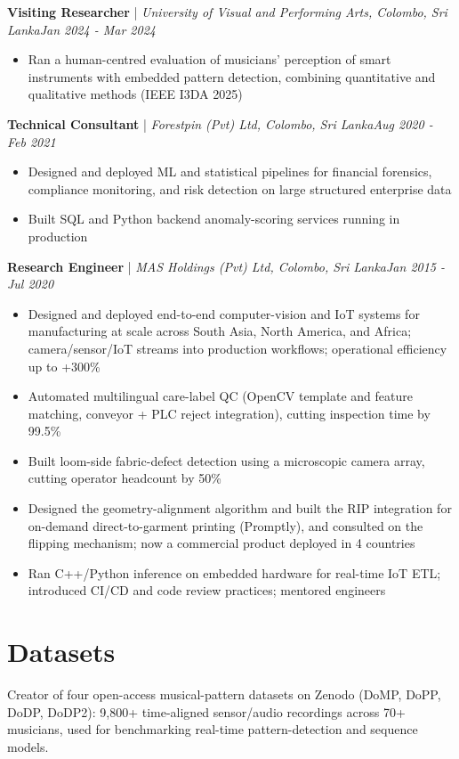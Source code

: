 \documentclass[11pt]{article}
\newenvironment{cvrole}[5]{%
  \par\noindent\textbf{\large #1} | \textit{\small #2, #3}\hfill \textit{\small #4 - #5}\par
  \begin{itemize}[leftmargin=2em, itemsep=-0.3em, topsep=-0.5em]%
}{%
  \end{itemize}\par\noindent\mbox{}\par\vspace{0.1em}%
}
\begin{document}
\begin{cvrole}{Visiting Researcher}{University of Visual and Performing Arts}{Colombo, Sri Lanka}{Jan 2024}{Mar 2024}
  \item Ran a human-centred evaluation of musicians' perception of smart instruments with embedded pattern detection, combining quantitative and qualitative methods (IEEE I3DA 2025)
\end{cvrole}

\begin{cvrole}{Technical Consultant}{Forestpin (Pvt) Ltd}{Colombo, Sri Lanka}{Aug 2020}{Feb 2021}
  \item Designed and deployed ML and statistical pipelines for financial forensics, compliance monitoring, and risk detection on large structured enterprise data
  \item Built SQL and Python backend anomaly-scoring services running in production
\end{cvrole}

\begin{cvrole}{Research Engineer}{MAS Holdings (Pvt) Ltd}{Colombo, Sri Lanka}{Jan 2015}{Jul 2020}
  \item Designed and deployed end-to-end computer-vision and IoT systems for manufacturing at scale across South Asia, North America, and Africa; camera/sensor/IoT streams into production workflows; operational efficiency up to +300\%
  \item Automated multilingual care-label QC (OpenCV template and feature matching, conveyor + PLC reject integration), cutting inspection time by 99.5\%
  \item Built loom-side fabric-defect detection using a microscopic camera array, cutting operator headcount by 50\%
  \item Designed the geometry-alignment algorithm and built the RIP integration for on-demand direct-to-garment printing (Promptly), and consulted on the flipping mechanism; now a commercial product deployed in 4 countries
  \item Ran C++/Python inference on embedded hardware for real-time IoT ETL; introduced CI/CD and code review practices; mentored engineers
\end{cvrole}

\section*{Datasets}
Creator of four open-access musical-pattern datasets on Zenodo (DoMP, DoPP, DoDP, DoDP2): 9,800+ time-aligned sensor/audio recordings across 70+ musicians, used for benchmarking real-time pattern-detection and sequence models.
\end{document}
